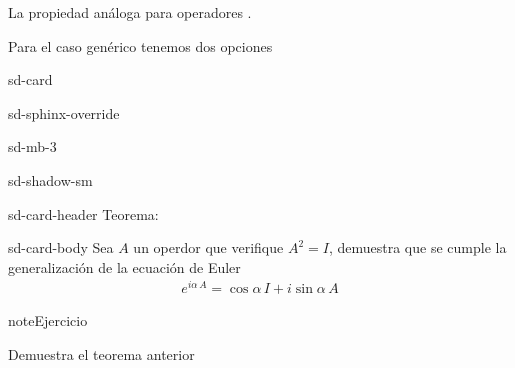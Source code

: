 \documentclass[letterpaper,10pt,english]{jupyterBook}
\begin{document}
\sphinxAtStartPar
La propiedad análoga para operadores .

\sphinxAtStartPar
Para el caso genérico tenemos dos opciones

\begin{sphinxuseclass}{sd-card}
\begin{sphinxuseclass}{sd-sphinx-override}
\begin{sphinxuseclass}{sd-mb-3}
\begin{sphinxuseclass}{sd-shadow-sm}
\begin{sphinxuseclass}{sd-card-header}
\sphinxAtStartPar
Teorema:

\end{sphinxuseclass}
\begin{sphinxuseclass}{sd-card-body}
\sphinxAtStartPar
Sea \(A\) un operdor que verifique \(A^2 = I\), demuestra que se cumple la generalización de la ecuación de Euler
\begin{equation*}
\begin{split}
e^{i \alpha\, A} = \cos \alpha \, I + i \sin \alpha \, A
\end{split}
\end{equation*}
\end{sphinxuseclass}
\end{sphinxuseclass}
\end{sphinxuseclass}
\end{sphinxuseclass}
\end{sphinxuseclass}
\begin{sphinxadmonition}{note}{Ejercicio}

\sphinxAtStartPar
Demuestra el teorema anterior
\end{sphinxadmonition}
\end{document}
